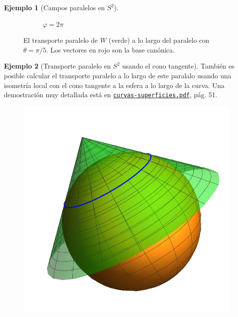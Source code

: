 \documentclass[spanish]{book}
\theoremstyle{definition}
\newtheorem*{ejem}{Ejemplo}
\begin{document}
\begin{ejem}[Campos paralelos en $S^2$]
\begin{figure}[H]
\begin{center}
\begin{subfigure}[t]{0.4\linewidth}
			\caption*{$\varphi=2\pi$}
		\end{subfigure}
	\end{center}
	\caption*{El transporte paralelo de $W$ (verde) a lo largo del paralelo con $\theta=\pi/5$. Los vectores en rojo son la base canónica.}
\end{figure}
	\end{ejem}
	
	\begin{ejem}[Transporte paralelo en $S^2$ usando el cono tangente]
		También es posible calcular el transporte paralelo a lo largo de este paralalo usando una isometría local con el cono tangente a la esfera a lo largo de la curva. Una demostración muy detallada está en \href{https://github.com/danimalabares/curvas-superficies/blob/main/curvas-superficies.pdf}{\texttt{curvas-superficies.pdf}}, pág. 51.
	\begin{figure}[H]
	\begin{center}
			\centering
			\includegraphics[width=0.5\linewidth]{fig16}
	\end{center}
	\end{figure}
	\end{ejem}
	
\end{document}
